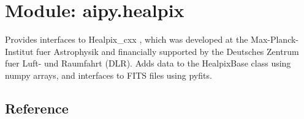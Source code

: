 \section{Module: aipy.healpix}

Provides interfaces to Healpix\_cxx \cite{gorski1999,gorski2005}, which was
developed at the Max-Planck-Institut fuer Astrophysik and financially
supported by the Deutsches Zentrum fuer Luft- und Raumfahrt (DLR).  Adds data
to the HealpixBase class using numpy arrays, and interfaces to FITS files
using pyfits.

\subsection{Reference}

